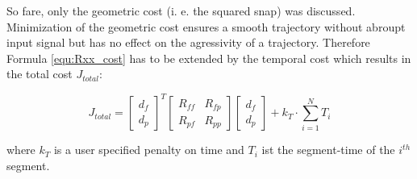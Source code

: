 So fare, only the geometric cost (i. e. the squared snap) was discussed. Minimization of the geometric cost ensures a smooth trajectory without abroupt input signal but has no effect on the agressivity of a trajectory. Therefore Formula \ref{equ:Rxx_cost} has to be extended by the temporal cost which results in the total cost $J_{total}$:

\begin{equation}
J_{total} =
\begin{bmatrix}
   d_f \\
  d_p
\end{bmatrix}^T
\begin{bmatrix}
   R_{ff} & R_{fp} \\
  R_{pf} & R_{pp}
\end{bmatrix}
\begin{bmatrix}
   d_f \\
  d_p
\end{bmatrix}
+ k_T \cdot \sum_{i=1}^N T_i
\label{equ:total_cost}
\end{equation}

where $k_T$ is a user specified penalty on time and $T_i$ ist the segment-time of the $i^{th}$ segment.

%
%



























